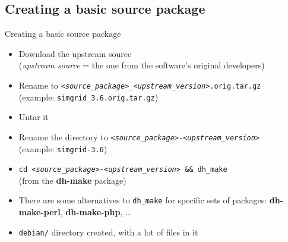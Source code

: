 \documentclass[10pt,final]{beamer}
\begin{document}
\subsection{Creating a basic source package}
\begin{frame}{Creating a basic source package}
  \begin{itemize}
  \item Download the upstream source\\
    (\textsl{upstream source} = the one from the software's original developers)
    \hbr
  \item Rename to \texttt{<\textsl{source\_package}>\_<\textsl{upstream\_version}>.orig.tar.gz}\\
    (example: \texttt{simgrid\_3.6.orig.tar.gz})
    \hbr
  \item Untar it
    \hbr
  \item Rename the directory to \texttt{<\textsl{source\_package}>-<\textsl{upstream\_version}>}\\
	  (example: \texttt{simgrid-3.6})
    \hbr
  \item \texttt{cd \texttt{<\textsl{source\_package}>-<\textsl{upstream\_version}>} \&\& dh\_make}\\
	  (from the \textbf{dh-make} package)
    \hbr
  \item There are some alternatives to \texttt{dh\_make} for specific sets of
    packages: \textbf{dh-make-perl}, \textbf{dh-make-php}, \ldots \hbr
  \item \texttt{debian/} directory created, with a lot of files in it
  \end{itemize}
\end{frame}
\end{document}
